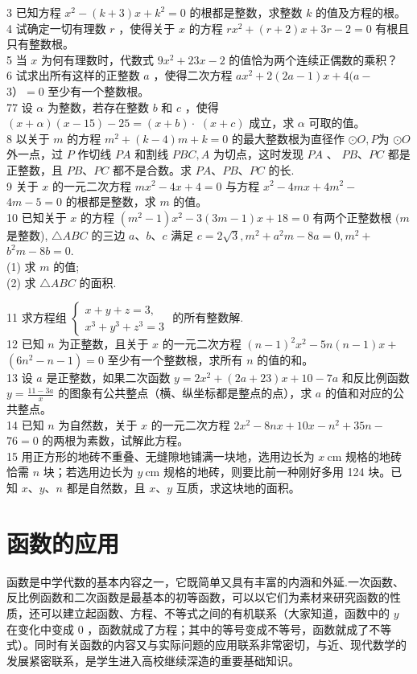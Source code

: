\documentclass[10pt]{article}
\begin{document}
3 已知方程 $x^{2}-(k+3) x+k^{2}=0$ 的根都是整数，求整数 $k$ 的值及方程的根。\\
4 试确定一切有理数 $r$ ，使得关于 $x$ 的方程 $r x^{2}+(r+2) x+3 r-2=0$ 有根且只有整数根。\\
5 当 $x$ 为何有理数时，代数式 $9 x^{2}+23 x-2$ 的值恰为两个连续正偶数的乘积？\\
6 试求出所有这样的正整数 $a$ ，使得二次方程 $a x^{2}+2(2 a-1) x+4(a-$ $3）=0$ 至少有一个整数根。\\
77 设 $\alpha$ 为整数，若存在整数 $b$ 和 $c$ ，使得 $(x+\alpha)(x-15)-25=(x+b) \cdot$ $(x+c)$ 成立，求 $\alpha$ 可取的值。\\
8 以关于 $m$ 的方程 $m^{2}+(k-4) m+k=0$ 的最大整数根为直径作 $\odot O, P$为 $\odot O$ 外一点，过 $P$ 作切线 $P A$ 和割线 $P B C, A$ 为切点，这时发现 $P A$ 、 $P B 、 P C$ 都是正整数，且 $P B 、 P C$ 都不是合数。求 $P A 、 P B 、 P C$ 的长.\\
9 关于 $x$ 的一元二次方程 $m x^{2}-4 x+4=0$ 与方程 $x^{2}-4 m x+4 m^{2}-$ $4 m-5=0$ 的根都是整数，求 $m$ 的值。\\
10 已知关于 $x$ 的方程 $\left(m^{2}-1\right) x^{2}-3(3 m-1) x+18=0$ 有两个正整数根 $(m$是整数), $\triangle A B C$ 的三边 $a 、 b 、 c$ 满足 $c=2 \sqrt{3}, m^{2}+a^{2} m-8 a=0, m^{2}+$ $b^{2} m-8 b=0$.\\
(1) 求 $m$ 的值;\\
(2) 求 $\triangle A B C$ 的面积.

11 求方程组 $\left\{\begin{array}{l}x+y+z=3, \\ x^{3}+y^{3}+z^{3}=3\end{array}\right.$ 的所有整数解.\\
12 已知 $n$ 为正整数，且关于 $x$ 的一元二次方程 $(n-1)^{2} x^{2}-5 n(n-1) x+$ $\left(6 n^{2}-n-1\right)=0$ 至少有一个整数根，求所有 $n$ 的值的和。\\
13 设 $a$ 是正整数，如果二次函数 $y=2 x^{2}+(2 a+23) x+10-7 a$ 和反比例函数 $y=\frac{11-3 a}{x}$ 的图象有公共整点（横、纵坐标都是整点的点），求 $a$ 的值和对应的公共整点。\\
14 已知 $n$ 为自然数，关于 $x$ 的一元二次方程 $2 x^{2}-8 n x+10 x-n^{2}+35 n-$ $76=0$ 的两根为素数，试解此方程。\\
15 用正方形的地砖不重叠、无缝隙地铺满一块地，选用边长为 $x \mathrm{~cm}$ 规格的地砖恰需 $n$ 块；若选用边长为 $y \mathrm{~cm}$ 规格的地砖，则要比前一种刚好多用 124 块。已知 $x 、 y 、 n$ 都是自然数，且 $x 、 y$ 互质，求这块地的面积。

\section*{函数的应用}
函数是中学代数的基本内容之一，它既简单又具有丰富的内涵和外延.一次函数、反比例函数和二次函数是最基本的初等函数，可以以它们为素材来研究函数的性质，还可以建立起函数、方程、不等式之间的有机联系（大家知道，函数中的 $y$ 在变化中变成 0 ，函数就成了方程；其中的等号变成不等号，函数就成了不等式）。同时有关函数的内容又与实际问题的应用联系非常密切，与近、现代数学的发展紧密联系，是学生进入高校继续深造的重要基础知识。
\end{document}
